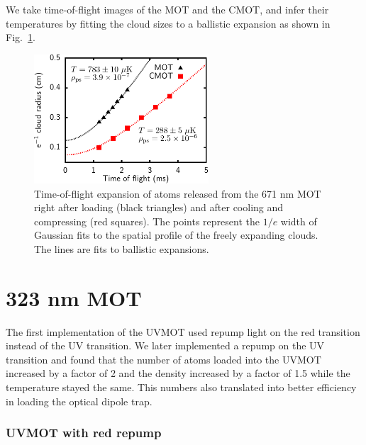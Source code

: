 \documentclass[oneside,12pt]{memoir}
\begin{document}
 We take time-of-flight images of
the MOT and the CMOT, and infer their temperatures by fitting the cloud sizes
to a ballistic expansion as shown in Fig.~\ref{fig:cmotexp}.   
\begin{figure} \hspace{0.16\textwidth}
\includegraphics[width=0.58\textwidth]{../figures/323mot/tofexpansion-00/tofeps-SS.pdf}
\caption[671 nm cooled and compressed MOT]{\small  Time-of-flight expansion of
atoms released from the 671 nm MOT right after loading (black triangles) and after
cooling and compressing (red squares). The points represent the $1/e$ width of
Gaussian fits to the spatial profile of the freely expanding clouds.  The lines
are fits to ballistic expansions. } \label{fig:cmotexp} \end{figure}
 
\section[323 nm MOT]{323 nm MOT}

The first implementation of the UVMOT used repump light on the red transition
instead of the UV transition.  We later implemented a repump on the UV
transition and found that the number of atoms loaded into the UVMOT increased
by a factor of 2 and the density increased by a factor of 1.5 while the
temperature stayed the same.   This numbers also translated into better
efficiency in loading the optical dipole trap. 

\subsubsection{UVMOT with red repump}
\end{document}
